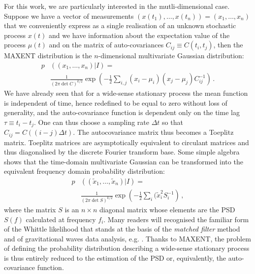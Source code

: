 \documentclass[twocolumn,showpacs,preprintnumbers,nofootinbib,prd,
superscriptaddress,10pt]{revtex4-1}
\begin{document}
For this work, we are particularly interested in the mutli-dimensional case. Suppose we have a vector of measurements $(x(t_1),\ldots,x(t_n)) = (x_1, \ldots, x_n)$ that we conveniently express as a single realisation of an unknown stochastic process $x(t)$ and we have information about the expectation value of the process $\mu(t)$ and on the matrix of auto-covariances $C_{ij} \equiv C(t_i,t_j)$, then the MAXENT distribution is the $n$-dimensional multivariate Gaussian distribution\cite{gregory_2005}: 
\begin{align}
    p&\left((x_1, \ldots, x_n)\vert I\right) = \nonumber \\
    &\frac{1}{\left(2 \pi \det C\right)^{k / 2}}\exp\left(-\frac{1}{2}\sum_{i,j}(x_i-\mu_i) (x_j-\mu_j)C^{-1}_{ij} \right)\,. 
\end{align}
We have already seen that for a wide-sense stationary process the mean function is independent of time, hence redefined to be equal to zero without loss of generality, and the auto-covariance function is dependent only on the time lag $\tau \equiv t_i - t_j$. One can thus choose a sampling rate $\Delta t$ so that $C_{ij} = C((i-j)\Delta t)$. The autocovariance matrix thus becomes a Toeplitz matrix. Toeplitz matrices are asymptotically equivalent to circulant matrices and thus diagonalised by the discrete Fourier transform base\cite{Gray}.
Some simple algebra shows that the time-domain multivariate Gaussian can be transformed into the equivalent frequency domain 
probability distribution:
\begin{align}
p&\left((\tilde{x}_1, \ldots, \tilde{x}_n)\vert I\right) = \nonumber \\
    &\frac{1}{\left(2 \pi \det S\right)^{k / 2}}\exp\left(-\frac{1}{2}\sum_{i}(\tilde{x}_i^2S^{-1}_{i} \right)\,,
\end{align}
where the matrix $S$ is an $n\times n$ diagonal matrix whose elements are the PSD $S(f)$ calculated at frequency $f_i$.
Many readers will recognised the familiar form of the Whittle likelihood that stands at the basis of the \emph{matched filter} method\cite{woodward}
and of gravitational waves data analysis, e.g. \cite{finn:1992}.
Thanks to MAXENT, the problem of defining the probability distribution describing a wide-sense stationary process is thus 
entirely reduced to the estimation of the PSD or, equivalently, the auto-covariance function.
\end{document}

